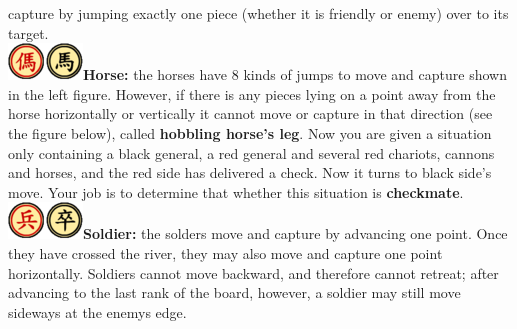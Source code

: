 \documentclass[12pt,a4paper]{article}
\begin{document}
capture by jumping exactly one piece (whether it is friendly or enemy)
over to its target.
\\\noindent
\textbf{\includegraphics{Xiangqi.assets/75px-Xiangqi_Horse.png}Horse:}
the horses have 8 kinds of jumps to move and capture shown in the left
figure. However, if there is any pieces lying on a point away from the
horse horizontally or vertically it cannot move or capture in that
direction (see the figure below), called \textbf{hobbling horse's
leg}. Now you are given a situation only containing a black general, a
red general and several red chariots, cannons and horses, and the red
side has delivered a check. Now it turns to black side's move. Your job
is to determine that whether this situation is \textbf{checkmate}.
\\\noindent
\textbf{\includegraphics{Xiangqi.assets/75px-Xiangqi_Soldier.png}Soldier:}
the solders move and capture by advancing one point. Once they have
crossed the river, they may also move and capture one point
horizontally. Soldiers cannot move backward, and therefore cannot
retreat; after advancing to the last rank of the board, however, a
soldier may still move sideways at the enemy\textquotesingle s edge.
\end{document}
